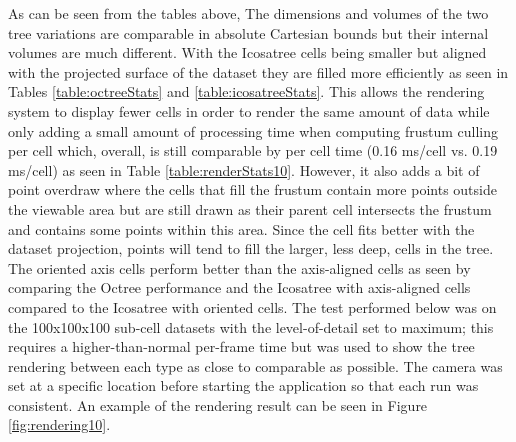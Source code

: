 As can be seen from the tables above, The dimensions and volumes of the two tree
variations are comparable in absolute Cartesian bounds but their internal
volumes are much different. With the Icosatree cells being smaller but aligned
with the projected surface of the dataset they are filled more efficiently as
seen in Tables \ref{table:octreeStats} and \ref{table:icosatreeStats}. This
allows the rendering system to display fewer cells in order to render the same
amount of data while only adding a small amount of processing time when
computing frustum culling per cell which, overall, is still comparable by per
cell time (0.16 ms/cell vs. 0.19 ms/cell) as seen in Table
\ref{table:renderStats10}. However, it also adds a bit of point overdraw where
the cells that fill the frustum contain more points outside the viewable area
but are still drawn as their parent cell intersects the frustum and contains
some points within this area. Since the cell fits better with the dataset
projection, points will tend to fill the larger, less deep, cells in the tree.
The oriented axis cells perform better than the axis-aligned cells as seen by
comparing the Octree performance and the Icosatree with axis-aligned cells
compared to the Icosatree with oriented cells. The test performed below was on
the 100x100x100 sub-cell datasets with the level-of-detail set to maximum; this
requires a higher-than-normal per-frame time but was used to show the tree
rendering between each type as close to comparable as possible. The camera was
set at a specific location before starting the application so that each run was
consistent. An example of the rendering result can be seen in Figure
\ref{fig:rendering10}.

\begin{table}[htp]
\caption{Rendering Statistics (depth = 10.0)}
\label{table:renderStats10}
\end{table}

